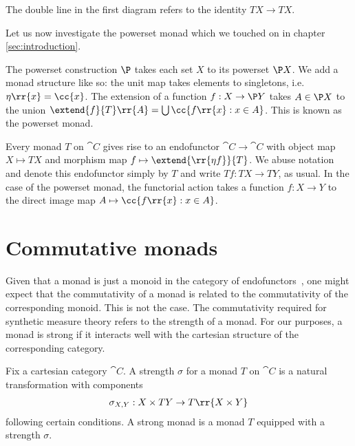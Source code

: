 The double line in the first diagram refers to the identity $TX\to TX$.

Let us now investigate the powerset monad which we touched on in chapter \ref{sec:introduction}.

\begin{example}
  The powerset construction $\P$ takes each set $X$ to its powerset $\P X$.
  We add a monad structure like so: the unit map takes elements
  to singletons, i.e. $\eta\rr{x}=\cc{x}$. The extension of a
  function $f:X\to\P Y$ takes $A\in\P X$ to the union
  $\extend{f}{T}\rr{A}=\bigcup \cc{f\rr{x} : x \in A}$.
  This is known as the powerset monad.
\end{example}

Every monad $T$ on $\cat{C}$ gives rise to an endofunctor $\cat{C}\to\cat{C}$
with object map $X\mapsto TX$ and morphism map $f\mapsto\extend{\rr{\eta
f}}{T}$. We abuse notation and denote this endofunctor simply by $T$ and write
$Tf:TX\to TY$, as usual. In the case of the powerset monad, the functorial
action takes a function $f:X\to Y$ to the direct image map $A \mapsto
\cc{f\rr{x} : x \in A}$.

\section{Commutative monads}\label{sec:commutative_monads}

Given that a monad is just a monoid in the category of
endofunctors~\cite{maclane1997}, one might expect that the commutativity of a
monad is related to the commutativity of the corresponding monoid. This is not
the case. The commutativity required for synthetic measure theory refers to the
strength of a monad. For our purposes, a monad is strong if it interacts well
with the cartesian structure of the corresponding category.

Fix a cartesian category $\cat{C}$.
A strength $\sigma$ for a monad $T$ on $\cat{C}$ is a natural
transformation with components
\begin{align*}
  \sigma_{X,Y}:X\times TY \to T\rr{X\times Y}
\end{align*}
following certain conditions. A strong monad is a monad $T$ equipped with a
strength $\sigma$.

